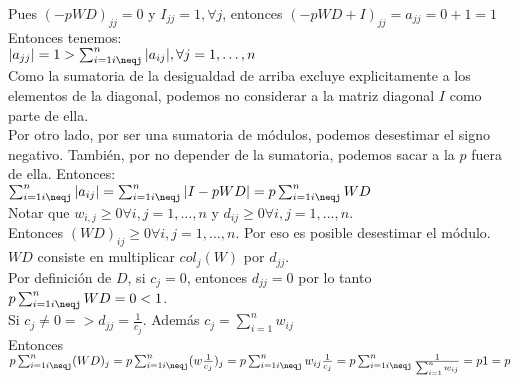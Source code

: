 		Pues $(-pWD)_{jj} = 0$ y $I_{jj} = 1, \forall j$, entonces $(-pWD + I)_{jj} = a_{jj} = 0 + 1 = 1$ \\

		Entonces tenemos: \\

		$|a_{jj}| = 1 > \sum_{i=1\\i\neqj}^{n} |a_{ij}|, \forall j = 1, \hdots, n$ \\

		Como la sumatoria de la desigualdad de arriba excluye explicitamente a los elementos de la diagonal, podemos no considerar a la matriz diagonal $I$ como parte de ella. \\

		Por otro lado, por ser una sumatoria de módulos, podemos desestimar el signo negativo. También, por no depender de la sumatoria, podemos sacar a la $p$ fuera de ella. Entonces: \\

		$\sum_{i=1\\i\neqj}^{n} |a_{ij}| = \sum_{i=1\\i\neqj}^{n} |I-pWD| = p \sum_{i=1\\i\neqj}^{n} WD$ \\

		Notar que $w_{i,j} \geq 0 \forall i,j = 1, \hdots, n$ y $d_{ij} \geq 0 \forall i,j = 1, \hdots, n$. \\

		Entonces $(WD)_{ij} \geq 0 \forall i,j = 1, \hdots, n$. Por eso es posible desestimar el módulo. \\

		$WD$ consiste en multiplicar $col_{j}(W)$ por $d_{jj}$. \\

		Por definición de $D$, si $c_{j} = 0$, entonces $d_{jj} = 0$ por lo tanto $p \sum_{i=1\\i\neqj}^{n} WD = 0 < 1$. \\

		Si $c_{j} \neq 0 => d_{jj} = \frac{1}{c_{j}}$. Además $c_{j} = \sum_{i=1}^{n} w_{ij}$ \\

		Entonces $ p \sum_{i=1\\i\neqj}^{n} (WD)_{j} = p \sum_{i=1\\i\neqj}^{n} (w \frac{1}{c_{j}})_{j} = 
			   p \sum_{i=1\\i\neqj}^{n} w_{ij} \frac{1}{c_j} = p \sum_{i=1\\i\neqj}^{n} \frac{1}{\sum_{i=1}^{n} w_{ij}} = 
			   p 1 = p												     $\\

